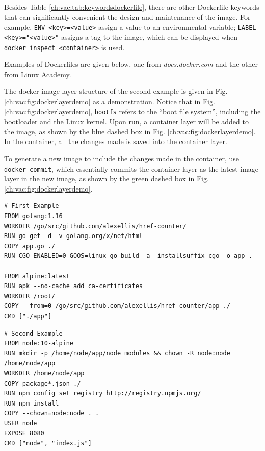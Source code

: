 Besides Table \ref{ch:vac:tab:keywordsdockerfile}, there are other Dockerfile keywords that can significantly convenient the design and maintenance of the image. For example, \verb|ENV <key>=<value>| assign a value to an environmental variable; \verb|LABEL <key>="<value>"| assigns a tag to the image, which can be displayed when \verb|docker inspect <container>| is used.

Examples of Dockerfiles are given below, one from \textit{docs.docker.com} and the other from Linux Academy.

The docker image layer structure of the second example is given in Fig. \ref{ch:vac:fig:dockerlayerdemo} as a demonstration. Notice that in Fig. \ref{ch:vac:fig:dockerlayerdemo}, \verb|bootfs| refers to the ``boot file system'', including the bootloader and the Linux kernel. Upon run, a container layer will be added to the image, as shown by the blue dashed box in Fig. \ref{ch:vac:fig:dockerlayerdemo}. In the container, all the changes made is saved into the container layer.

To generate a new image to include the changes made in the container, use \verb|docker commit|, which essentially commits the container layer as the latest image layer in the new image, as shown by the green dashed box in Fig. \ref{ch:vac:fig:dockerlayerdemo}.

\begin{lstlisting}
# First Example
FROM golang:1.16
WORKDIR /go/src/github.com/alexellis/href-counter/
RUN go get -d -v golang.org/x/net/html
COPY app.go ./
RUN CGO_ENABLED=0 GOOS=linux go build -a -installsuffix cgo -o app .

FROM alpine:latest
RUN apk --no-cache add ca-certificates
WORKDIR /root/
COPY --from=0 /go/src/github.com/alexellis/href-counter/app ./
CMD ["./app"]
\end{lstlisting}

\begin{lstlisting}
# Second Example
FROM node:10-alpine
RUN mkdir -p /home/node/app/node_modules && chown -R node:node /home/node/app
WORKDIR /home/node/app
COPY package*.json ./
RUN npm config set registry http://registry.npmjs.org/
RUN npm install
COPY --chown=node:node . .
USER node
EXPOSE 8080
CMD ["node", "index.js"]
\end{lstlisting}

